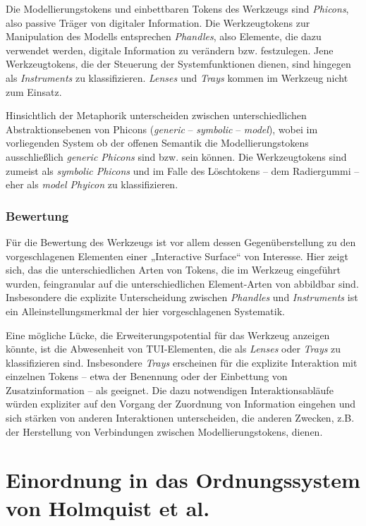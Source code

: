 Die Modellierungstokens und einbettbaren Tokens des Werkzeugs sind \emph{Phicons}, also passive Träger von digitaler Information. Die Werkzeugtokens zur Manipulation des Modells entsprechen \emph{Phandles}, also Elemente, die dazu verwendet werden, digitale Information zu verändern bzw. festzulegen. Jene Werkzeugtokens, die der Steuerung der Systemfunktionen dienen, sind hingegen als \emph{Instruments} zu klassifizieren. \emph{Lenses} und \emph{Trays} kommen im Werkzeug nicht zum Einsatz.

Hinsichtlich der Metaphorik unterscheiden \citet{Ullmer97} zwischen unterschiedlichen Abstraktionsebenen von Phicons (\emph{generic} -- \emph{symbolic} -- \emph{model}), wobei im vorliegenden System ob der offenen Semantik die Modellierungstokens ausschließlich \emph{generic Phicons} sind bzw. sein können. Die Werkzeugtokens sind zumeist als \emph{symbolic Phicons} und im Falle des Löschtokens -- dem Radiergummi -- eher als \emph{model Phyicon} zu klassifizieren.

\subsubsection{Bewertung} 

Für die Bewertung des Werkzeugs ist vor allem dessen Gegenüberstellung zu den vorgeschlagenen Elementen einer „Interactive Surface“ von Interesse. Hier zeigt sich, das die unterschiedlichen Arten von Tokens, die im Werkzeug eingeführt wurden, feingranular auf die unterschiedlichen Element-Arten von \citep{Ishii97} abbildbar sind. Insbesondere die explizite Unterscheidung zwischen \emph{Phandles} und \emph{Instruments} ist ein Alleinstellungsmerkmal der hier vorgeschlagenen Systematik.

Eine mögliche Lücke, die Erweiterungspotential für das Werkzeug anzeigen könnte, ist die Abwesenheit von TUI-Elementen, die als \emph{Lenses} oder \emph{Trays} zu klassifizieren sind. Insbesondere \emph{Trays} erscheinen für die explizite Interaktion mit einzelnen Tokens -- etwa der Benennung oder der Einbettung von Zusatzinformation -- als geeignet. Die dazu notwendigen Interaktionsabläufe würden expliziter auf den Vorgang der Zuordnung von Information eingehen und sich stärken von anderen Interaktionen unterscheiden, die anderen Zwecken, z.B. der Herstellung von Verbindungen zwischen Modellierungstokens, dienen.


\section{Einordnung in das Ordnungssystem von Holmquist et al.} %
\label{sec:einordnung_in_das_ordnungssystem_von_holmquist_et_al_}

